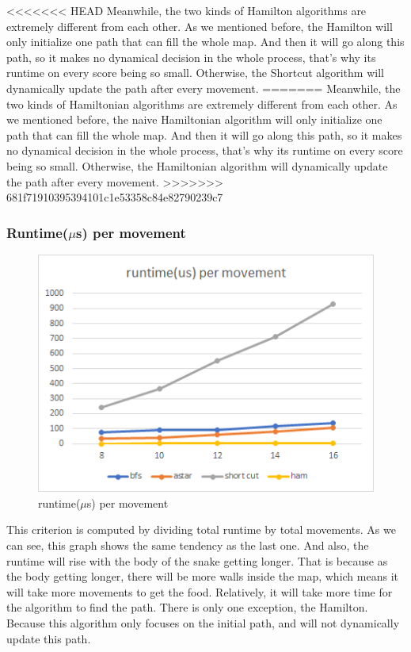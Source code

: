 \documentclass[12pt]{article}
\begin{document}
<<<<<<< HEAD
Meanwhile, the two kinds of Hamilton algorithms are extremely different from each other. 
As we mentioned before, the Hamilton will only initialize one path that can fill the whole map. 
And then it will go along this path, so it makes no dynamical decision in the whole process, 
that's why its runtime on every score being so small. Otherwise, the Shortcut algorithm will 
dynamically update the path after every movement. 
=======
Meanwhile, the two kinds of Hamiltonian algorithms are extremely different from each other. As we mentioned before, the naive Hamiltonian algorithm will only initialize one path that can fill the whole map. And then it will go along this path, so it makes no dynamical decision in the whole process, that's why its runtime on every score being so small. Otherwise, the Hamiltonian algorithm will dynamically update the path after every movement. 
>>>>>>> 681f71910395394101c1e53358c84e82790239c7

\subsubsection{Runtime($\mu$s) per movement}



\begin{figure}[H]
    \centering 
    \includegraphics[scale = 0.9]{anay3.png}
    \caption{runtime($\mu$s) per movement}
\end{figure}

This criterion is computed by dividing total runtime by total movements. As we can see, 
this graph shows the same tendency as the last one. And also, the runtime will rise with the 
body of the snake getting longer. That is because as the body getting longer, there will be 
more walls inside the map, which means it will take more movements to get the food. Relatively, 
it will take more time for the algorithm to find the path. There is only one exception, 
the Hamilton. Because this algorithm only focuses on the initial path, and will not dynamically 
update this path.
\end{document}
